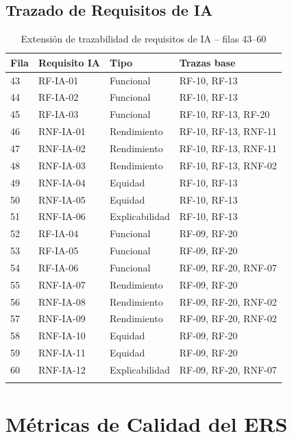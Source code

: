 \documentclass[11pt,a4paper]{article}
\begin{document}
\subsection{Trazado de Requisitos de IA}

\begin{longtable}{|p{2cm}|p{2cm}|p{3cm}|p{5.5cm}|}
\hline
\textbf{Fila} & \textbf{Requisito IA} & \textbf{Tipo} & \textbf{Trazas base} \\
\hline
43 & RF-IA-01 & Funcional & RF-10, RF-13 \\
44 & RF-IA-02 & Funcional & RF-10, RF-13 \\
45 & RF-IA-03 & Funcional & RF-10, RF-13, RF-20 \\
46 & RNF-IA-01 & Rendimiento & RF-10, RF-13, RNF-11 \\
47 & RNF-IA-02 & Rendimiento & RF-10, RF-13, RNF-11 \\
48 & RNF-IA-03 & Rendimiento & RF-10, RF-13, RNF-02 \\
49 & RNF-IA-04 & Equidad & RF-10, RF-13 \\
50 & RNF-IA-05 & Equidad & RF-10, RF-13 \\
51 & RNF-IA-06 & Explicabilidad & RF-10, RF-13 \\
52 & RF-IA-04 & Funcional & RF-09, RF-20 \\
53 & RF-IA-05 & Funcional & RF-09, RF-20 \\
54 & RF-IA-06 & Funcional & RF-09, RF-20, RNF-07 \\
55 & RNF-IA-07 & Rendimiento & RF-09, RF-20 \\
56 & RNF-IA-08 & Rendimiento & RF-09, RF-20, RNF-02 \\
57 & RNF-IA-09 & Rendimiento & RF-09, RF-20, RNF-02 \\
58 & RNF-IA-10 & Equidad & RF-09, RF-20 \\
59 & RNF-IA-11 & Equidad & RF-09, RF-20 \\
60 & RNF-IA-12 & Explicabilidad & RF-09, RF-20, RNF-07 \\
\hline
\caption{Extensión de trazabilidad de requisitos de IA -- filas 43--60}
\label{tab:traza_ia}
\end{longtable}

\section{Métricas de Calidad del ERS}
\label{sec:metricas}
\end{document}
